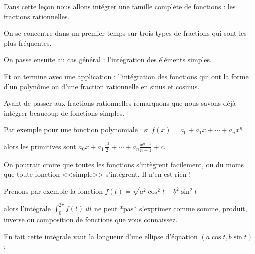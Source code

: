 







\debuttexte

\diapo

\change

Dans cette leçon nous allons intégrer une famille complète de fonctions : les fractions rationnelles.

\change

On se concentre dans un premier temps sur trois types de fractions qui sont les plus fréquentes.

\change

On passe ensuite au cas général : l'intégration des éléments simples.

\change

Et on termine avec une application : l'intégration des fonctions qui ont la forme d'un polynôme ou d'une fraction rationnelle
en sinus et cosinus.



\diapo

Avant de passer aux fractions rationnelles remarquons que 
nous savons déjà intégrer beaucoup de fonctions simples. 

Par exemple pour une fonction polynomiale : si $f(x)=a_0+a_1x+\cdots+ a_n x^n$

\change

alors les primitives sont $a_0x+a_1\frac{x^2}{2}+\cdots+a_n\frac{x^{n+1}}{n+1}+c$.

\change

On pourrait croire que toutes les fonctions s'intègrent facilement, ou du moins que toute fonction <<simple>>
s'intègrent. Il n'en est rien !



Prenons par exemple la fonction $f(t)=\sqrt{a^2\cos^2 t+ b^2 \sin^2 t}$ 

\change

alors
l'intégrale $\int_0^{2\pi} f(t) \; dt$ ne peut *pas* s'exprimer 
comme somme, produit, inverse ou composition de fonctions que vous connaissez.

\change

En fait cette intégrale vaut la longueur d'une ellipse
d'équation  $(a\cos t, b\sin t)$ ; 

